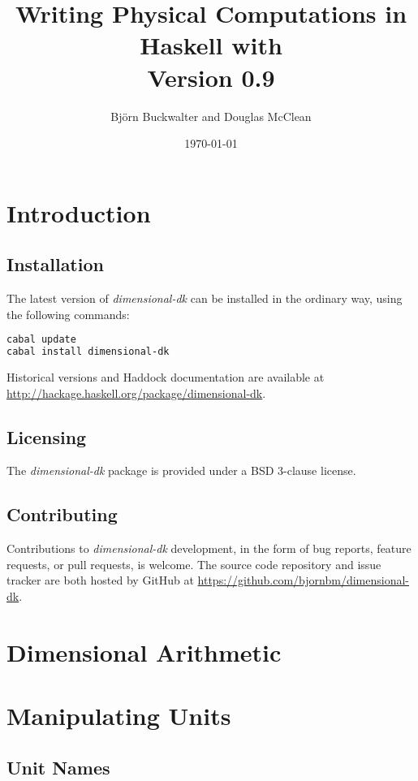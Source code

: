 \documentclass[12pt]{report}
\title{
	{Writing Physical Computations in Haskell with \packagename{dimensional-dk}}\\
	{\small{Version 0.9}}
}
\author{Björn Buckwalter and Douglas McClean}
\date{\today}
\newcommand{\packagename}[1]{\textit{#1}}
\begin{document}
\maketitle

\tableofcontents

\chapter{Introduction}

\section{Installation}

The latest version of \packagename{dimensional-dk} can be installed in the ordinary way, using the following commands:

\begin{lstlisting}[language=bash]
cabal update
cabal install dimensional-dk
\end{lstlisting}

Historical versions and Haddock documentation are available at \url{http://hackage.haskell.org/package/dimensional-dk}.

\section{Licensing}

The \packagename{dimensional-dk} package is provided under a BSD 3-clause license.

\section{Contributing}

Contributions to \packagename{dimensional-dk} development, in the form of bug reports, feature requests, or pull requests, is welcome.
The source code repository and issue tracker are both hosted by GitHub at \url{https://github.com/bjornbm/dimensional-dk}.

\chapter{Dimensional Arithmetic}

\chapter{Manipulating Units}

\section{Unit Names}
\end{document}
